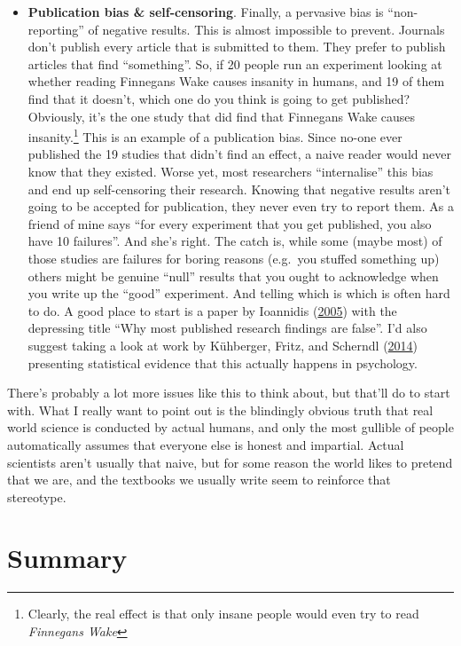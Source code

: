 \documentclass[
]{book}
\begin{document}
\begin{itemize}
\item
  \textbf{Publication bias \& self-censoring}. Finally, a pervasive bias is ``non-reporting'' of negative results. This is almost impossible to prevent. Journals don't publish every article that is submitted to them. They prefer to publish articles that find ``something''. So, if 20 people run an experiment looking at whether reading Finnegans Wake causes insanity in humans, and 19 of them find that it doesn't, which one do you think is going to get published? Obviously, it's the one study that did find that Finnegans Wake causes insanity.\footnote{Clearly, the real effect is that only insane people would even try to read \emph{Finnegans Wake}} This is an example of a publication bias. Since no-one ever published the 19 studies that didn't find an effect, a naive reader would never know that they existed. Worse yet, most researchers ``internalise'' this bias and end up self-censoring their research. Knowing that negative results aren't going to be accepted for publication, they never even try to report them. As a friend of mine says ``for every experiment that you get published, you also have 10 failures''. And she's right. The catch is, while some (maybe most) of those studies are failures for boring reasons (e.g.~you stuffed something up) others might be genuine ``null'' results that you ought to acknowledge when you write up the ``good'' experiment. And telling which is which is often hard to do. A good place to start is a paper by Ioannidis (\protect\hyperlink{ref-Ioannidis2005}{2005}) with the depressing title ``Why most published research findings are false''. I'd also suggest taking a look at work by Kühberger, Fritz, and Scherndl (\protect\hyperlink{ref-Kuhberger2014}{2014}) presenting statistical evidence that this actually happens in psychology.
\end{itemize}

There's probably a lot more issues like this to think about, but that'll do to start with. What I really want to point out is the blindingly obvious truth that real world science is conducted by actual humans, and only the most gullible of people automatically assumes that everyone else is honest and impartial. Actual scientists aren't usually that naive, but for some reason the world likes to pretend that we are, and the textbooks we usually write seem to reinforce that stereotype.

\hypertarget{summary}{%
\section{Summary}\label{summary}}
\end{document}
